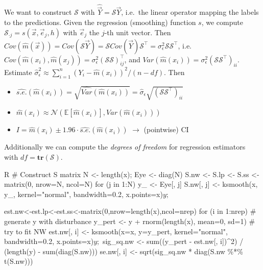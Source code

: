 \begin{sectionbox}\nospacing{}
  We want to construct $\mathcal{S}$ with $\hat{\vec{Y}} = \mathcal{S}\vec{Y}$, i.e.\ the linear operator mapping the labels to the predictions.
  Given the regression (smoothing) function $s$, we compute $\mathcal{S}_{\cdot j} = s(\vec{x}, \vec{e}_{j}, h)$ with $\vec{e}_{j}$ the $j$-th unit vector.
  Then $Cov(\hat m(\vec{x})) = Cov(\mathcal{S} \vec{Y}) = \mathcal{S} Cov(\vec{Y}) \mathcal{S}^{\top} = \sigma_{\epsilon}^{2}\mathcal{S}\mathcal{S}^{\top}$, i.e. $Cov(\hat m(x_{i}), \hat m(x_{j})) = \sigma_{\epsilon}^{2}{(\mathcal{S}\mathcal{S})}^{\top}_{ij}$, and $Var(\hat m(x_{i})) = \sigma_{\epsilon}^{2}{(\mathcal{S}\mathcal{S}^{\top})}_{ii}$.
  Estimate $\hat{\sigma}_{\epsilon}^{2} \approx \sum_{i=1}^{n}{(Y_{i} - \hat m(x_{i}))}^{2}/(n-df)$.
  Then
  \begin{itemize}
    \item $\widehat{s.e.}(\hat m(x_{i})) = \sqrt{\widehat{Var}(\hat m(x_{i}))} = \hat \sigma_{\epsilon} \sqrt{{(\mathcal{S}\mathcal{S}^{\top})}_{ii}}$
    \item $\hat m(x_{i}) \approx \mathcal{N}\left(\mathbb{E}[\hat m(x_{i})], Var(\hat m(x_{i}))\right)$
    \item $I = \hat m(x_{i}) \pm 1.96 \cdot \widehat{s.e.}(\hat m(x_{i}))$ $\rightarrow$ (pointwise) CI
  \end{itemize}

  Additionally we can compute the \emph{degrees of freedom} for regression estimators with $df = \mathbf{tr}(\mathcal{S})$.
\end{sectionbox}
\begin{mintlinebox}{R}
  # Construct S matrix
  N <- length(x); Eye <- diag(N)
  S.nw <- S.lp <- S.ss <- matrix(0, nrow=N, ncol=N)
  for (j in 1:N) {
    y_ <- Eye[, j]
  S.nw[, j] <- ksmooth(x, y_, kernel="normal", bandwidth=0.2, x.points=x)$y ;$}

  est.nw<-est.lp<-est.ss<-matrix(0,nrow=length(x),ncol=nrep)
  for (i in 1:nrep) {
    # generate y with disturbance
    y_pert <- y + rnorm(length(x), mean=0, sd=1)
    # try to fit NW
    est.nw[, i] <- ksmooth(x=x, y=y_pert, kernel="normal", bandwidth=0.2, x.points=x)$y ;$
    sig_sq.nw <- sum((y_pert - est.nw[, i])^2) / (length(y) - sum(diag(S.nw)))
  se.nw[, i] <- sqrt(sig_sq.nw * diag(S.nw \%*\% t(S.nw)))}
\end{mintlinebox}

